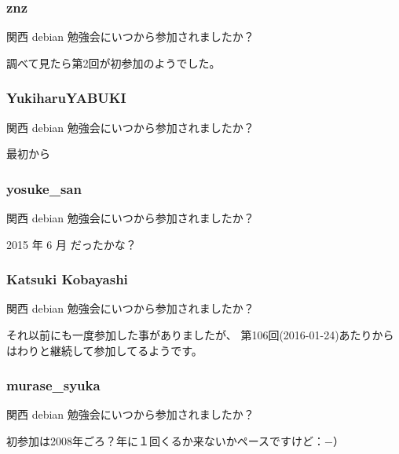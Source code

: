 \documentclass[cjk,dvipdfmx,10pt,compress,%
hyperref={bookmarks=true,bookmarksnumbered=true,bookmarksopen=false,%
colorlinks=false,%
pdftitle={第 121 回 関西 Debian 勉強会},%
pdfauthor={倉敷・のがた・佐々木・かわだ},%
pdfsubject={資料},%
}]{beamer}
\begin{document}
\begin{frame}[fragile]
  \frametitle{znz}
    \begin{block}{関西 debian 勉強会にいつから参加されましたか？}
        \begin{description}
            \item 調べて見たら第2回が初参加のようでした。
        \end{description}
    \end{block}
\end{frame}

\begin{frame}[fragile]
  \frametitle{YukiharuYABUKI}
    \begin{block}{関西 debian 勉強会にいつから参加されましたか？}
        \begin{description}
            \item 最初から
        \end{description}
    \end{block}
\end{frame}

\begin{frame}[fragile]
  \frametitle{yosuke\_san}
    \begin{block}{関西 debian 勉強会にいつから参加されましたか？}
        \begin{description}
            \item 2015 年 6 月 だったかな？
        \end{description}
    \end{block}
\end{frame}

\begin{frame}[fragile]
  \frametitle{Katsuki Kobayashi}
    \begin{block}{関西 debian 勉強会にいつから参加されましたか？}
        \begin{description}
            \item それ以前にも一度参加した事がありましたが、
              第106回(2016-01-24)あたりからはわりと継続して参加してるようです。
        \end{description}
    \end{block}
\end{frame}

\begin{frame}[fragile]
  \frametitle{murase\_syuka }
    \begin{block}{関西 debian 勉強会にいつから参加されましたか？}
        \begin{description}
            \item 初参加は2008年ごろ？年に１回くるか来ないかペースですけど：−）
        \end{description}
    \end{block}
\end{frame}
\end{document}
